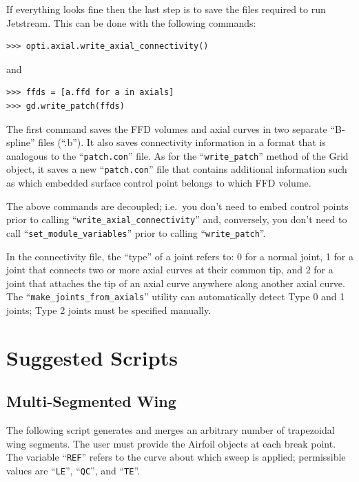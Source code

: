 \documentclass[]{article}
\begin{document}
If everything looks fine then the last step is to save the files 
required to run Jetstream.  This can be done with the following 
commands:
\begin{verbatim}
>>> opti.axial.write_axial_connectivity()
\end{verbatim}
and
\begin{verbatim}
>>> ffds = [a.ffd for a in axials]
>>> gd.write_patch(ffds)
\end{verbatim}
The first command saves the FFD volumes and axial curves in two separate 
``B-spline'' files (``.b'').  It also saves connectivity information in 
a format that is analogous to the ``\texttt{patch.con}'' file.  As for 
the ``\texttt{write\_patch}'' method of the Grid object, it saves a new 
``\texttt{patch.con}'' file that contains additional information such as 
which embedded surface control point belongs to which FFD volume.

The above commands are decoupled; i.e.\ you don't need to embed control 
points prior to calling ``\texttt{write\_axial\_connectivity}'' and, 
conversely, you don't need to call ``\texttt{set\_module\_variables}'' 
prior to calling ``\texttt{write\_patch}''.

In the connectivity file, the ``type'' of a joint refers to: 0 for a 
normal joint, 1 for a joint that connects two or more axial curves at 
their common tip, and 2 for a joint that attaches the tip of an axial 
curve anywhere along another axial curve.  The 
``\texttt{make\_joints\_from\_axials}'' utility can automatically detect 
Type 0 and 1 joints; Type 2 joints must be specified manually.


\newpage
\section{Suggested Scripts}
\label{app:scripts}

\subsection{Multi-Segmented Wing}
\label{app:wing}

The following script generates and merges an arbitrary number of 
trapezoidal wing segments.  The user must provide the Airfoil objects at 
each break point.  The variable ``\texttt{REF}'' refers to the curve 
about which sweep is applied; permissible values are ``\texttt{LE}'', 
``\texttt{QC}'', and ``\texttt{TE}''.
\end{document}
